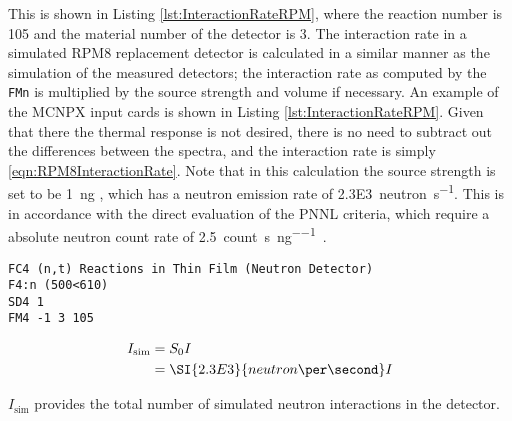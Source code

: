 This is shown in Listing \ref{lst:InteractionRateRPM}, where the reaction number is 105 and the material number of the detector is 3.
The interaction rate in a simulated RPM8 replacement detector is calculated in a similar manner as the simulation of the measured detectors; the interaction rate as computed by the \verb+FMn+ is multiplied by the source strength and volume if necessary.
An example of the MCNPX input cards is shown in Listing \ref{lst:InteractionRateRPM}.
Given that there the thermal response is not desired, there is no need to subtract out the differences between the spectra, and the interaction rate is simply \eqref{eqn:RPM8InteractionRate}.
Note that in this calculation the source strength is set to be \SI{1}{\nano\gram} , which has a neutron emission rate of \SI{2.3E3}{neutron\per\second}.
This is in accordance with the direct evaluation of the PNNL criteria, which require a absolute neutron count rate of \SI{2.5}{count\per\second\per\nano\gram{}}.
\begin{lstlisting}[caption={[RPM8 ${}^{6}\text{Li}\left(\text{n},\text{t}\right)\alpha$ Reaction Rate]RPM8 ${}^{6}\text{Li}\left(\text{n},\text{t}\right)\alpha$ Reaction Rate. The detector is all of the layers of cell 500 inside universe 610. This tally is multiplied by an SD card to normalize by the volume},label={lst:InteractionRateRPM}]
FC4 (n,t) Reactions in Thin Film (Neutron Detector)
F4:n (500<610)
SD4 1
FM4 -1 3 105
\end{lstlisting}
\begin{align}
  \label{eqn:RPM8InteractionRate}
  I_{\text{sim}} &= S_0 I \\
  &= \SI{2.3E3}{neutron\per\second} I
\end{align}

$I_{\text{sim}}$ provides the total number of simulated neutron interactions in the detector.
